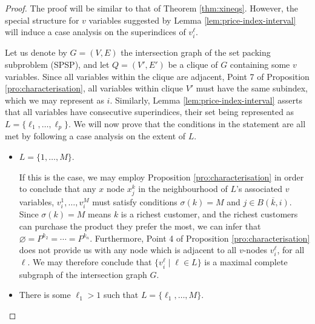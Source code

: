 \begin{proof}
    The proof will be similar to that of Theorem \ref{thm:xineqs}. However, the
    special structure for $v$ variables suggested by Lemma
    \ref{lem:price-index-interval} will induce a case analysis on the
    superindices of $v_i^\ell$.

    Let us denote by $G = (V, E)$ the intersection graph of the set packing
    subproblem (SPSP), and let $Q = (V', E')$ be a clique of $G$ containing some
    $v$ variables. Since all variables within the clique are adjacent, Point 7
    of Proposition \ref{pro:characterisation}, all variables within clique $V'$
    must have the same subindex, which we may represent as $i$. Similarly, Lemma
    \ref{lem:price-index-interval} asserts that all variables have consecutive
    superindices, their set being represented as $L = \{\ell_1, \ldots,
    \ell_p\}$. We will now prove that the conditions in the statement are all
    met by following a case analysis on the extent of $L$.

    \begin{itemize}
        \item
            $L = \{1, \ldots, M\}$.
            
	    If this is the case, we may employ Proposition
	    \ref{pro:characterisation} in order to conclude that any $x$ node
	    $x_j^k$ in the neighbourhood of $L$'s associated $v$ variables,
	    $v_i^1, \ldots, v_i^M$ must satisfy conditions $\sigma(k) = M$ and
	    $j \in \overline{B(k, i)}$. Since $\sigma(k) = M$ means $k$ is a
	    richest customer, and the richest customers can purchase the product
	    they prefer the most, we can infer that $\varnothing = P^{k_2} =
	    \cdots = P^{k_n}$. Furthermore, Point 4 of Proposition
	    \ref{pro:characterisation} does not provide us with any node which
	    is adjacent to all $v$-nodes $v_i^\ell$, for all $\ell$. We may
	    therefore conclude that $\{v_i^\ell \mid \ell \in L\}$ is a maximal
	    complete subgraph of the intersection graph $G$.
	\item
	    There is some $\ell_1 > 1$ such that $L = \{\ell_1, \ldots, M\}$.


\end{itemize}
\end{proof}
